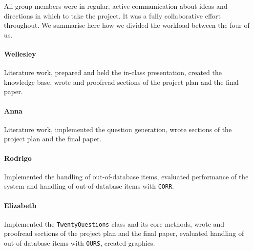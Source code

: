 \documentclass[11pt,a4paper]{article}
\begin{document}
All group members were in regular, active communication about ideas and directions in which to take the project.
It was a fully collaborative effort throughout.
We summarise here how we divided the workload between the four of us.

\paragraph{Wellesley} Literature work, prepared and held the in-class presentation, created the knowledge base, wrote and proofread sections of the project plan and the final paper.

\paragraph{Anna} Literature work, implemented the question generation, wrote sections of the project plan and the final paper.

\paragraph{Rodrigo} Implemented the handling of out-of-database items, evaluated performance of the system and handling of out-of-database items with \texttt{CORR}.

\paragraph{Elizabeth} Implemented the \texttt{TwentyQuestions} class and its core methods, wrote and proofread sections of the project plan and the final paper, evaluated handling of out-of-database items with \texttt{OURS}, created graphics.
\end{document}
